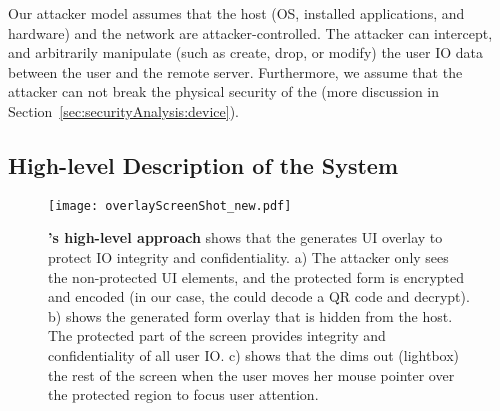  Our attacker model assumes that the host (OS, installed applications, and hardware) and the network are attacker-controlled. The attacker can intercept, and arbitrarily manipulate (such as create, drop, or modify) the user IO data between the user and the remote server. Furthermore, we assume that the attacker can not break the physical security of the \device (more discussion in Section~\ref{sec:securityAnalysis:device}).



\subsection{High-level Description of the System}

\begin{figure}[t]
\centering
\texttt{[image: overlayScreenShot\_new.pdf]}
\caption{\textbf{\name's high-level approach} shows that the \device generates UI overlay to protect IO integrity and confidentiality. a) The attacker only sees the non-protected UI elements, and the protected form is encrypted and encoded (in our case, the \device could decode a QR code and decrypt). b) shows the \device generated form overlay that is hidden from the host. The protected part of the screen provides integrity and confidentiality of all user IO. c) shows that the \device dims out (lightbox) the rest of the screen when the user moves her mouse pointer over the protected region to focus user attention.}
\spacesave
\label{fig:screenshot_1}
\end{figure}

